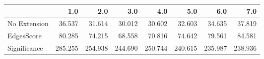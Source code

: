\begin{tabular}{lrrrrrrr}
\toprule
{} &     1.0 &     2.0 &     3.0 &     4.0 &     5.0 &     6.0 &     7.0 \\
\midrule
No Extension &  36.537 &  31.614 &  30.012 &  30.602 &  32.603 &  34.635 &  37.819 \\
EdgesScore   &  80.285 &  74.215 &  68.558 &  70.816 &  74.642 &  79.561 &  84.581 \\
Significance & 285.255 & 254.938 & 244.690 & 250.744 & 240.615 & 235.987 & 238.936 \\
\bottomrule
\end{tabular}
